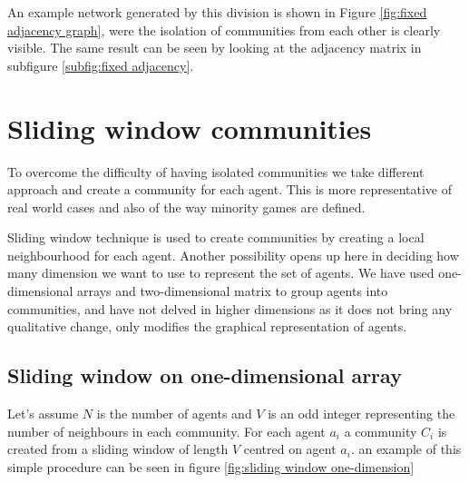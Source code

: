An example network generated by this division is shown in Figure \ref{fig:fixed adjacency graph}, were the isolation of communities from each other is clearly visible.
The same result can be seen by looking at the adjacency matrix in subfigure \ref{subfig:fixed adjacency}.

\section{Sliding window communities}
\label{sec:sliding communities}

To overcome the difficulty of having isolated communities we take different approach and create a community for each agent.
This is more representative of real world cases and also of the way minority games are defined.

Sliding window technique is used to create communities by creating a local neighbourhood for each agent.
Another possibility opens up here in deciding how many dimension we want to use to represent the set of agents.
We have used one-dimensional arrays and two-dimensional matrix to group agents into communities, and have not delved in higher dimensions as it does not bring any qualitative change, only modifies the graphical representation of agents.

\subsection{Sliding window on one-dimensional array}

Let's assume $N$ is the number of agents and $V$ is an odd integer representing the number of neighbours in each community.
For each agent $a_i$ a community $C_i$ is created from a sliding window of length $V$ centred on agent $a_i$.
an example of this simple procedure can be seen in figure \ref{fig:sliding window one-dimension}



